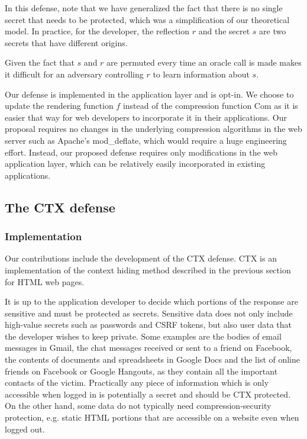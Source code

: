 \documentclass[conference, letterpaper, 10pt]{IEEEtran}
\begin{document}
In this defense, note that we have generalized the fact that there is no single
secret that needs to be protected, which was a simplification of our
theoretical model. In practice, for the developer, the reflection $r$ and the
secret $s$ are two secrets that have different origins.

Given the fact that $s$ and $r$ are permuted every time an oracle call is made
makes it difficult for an adversary controlling $r$ to learn information about
$s$.

Our defense is implemented in the application layer and is opt-in. We choose to
update the rendering function $f$ instead of the compression function
$\textrm{Com}$ as it is easier that way for web developers to incorporate it in
their applications. Our proposal requires no changes in the underlying
compression algorithms in the web server such as Apache's mod\_deflate, which
would require a huge engineering effort. Instead, our proposed defense requires
only modifications in the web application layer, which can be relatively easily
incorporated in existing applications.

\subsection{The CTX defense}\label{subsec:ctx}

\subsubsection{Implementation}
Our contributions include the development of the CTX defense. CTX is an
implementation of the context hiding method described in the previous section
for HTML web pages.

It is up to the application developer to decide which portions of the response
are sensitive and must be protected as secrets. Sensitive data does not only
include high-value secrets such as passwords and CSRF tokens, but also user data
that the developer wishes to keep private. Some examples are the bodies of email
messages in Gmail, the chat messages received or sent to a friend on Facebook,
the contents of documents and spreadsheets in Google Docs and the list of online
friends on Facebook or Google Hangouts, as they contain all the important
contacts of the victim. Practically any piece of information which is only
accessible when logged in is potentially a secret and should be CTX protected.
On the other hand, some data do not typically need compression-security
protection, e.g. static HTML portions that are accessible on a website even when
logged out.
\end{document}

